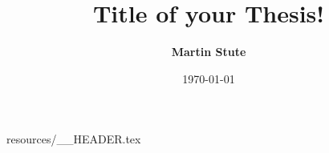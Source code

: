 
 {resources/__HEADER.tex}
\entrue


	

		\title 				{Title of your Thesis!}
		\author 			{\textbf{Martin Stute}}
		\def\authordata		{Pferdeweg 42 \\
				 		50769, Cologne \\
				 		martin.stute@gmx.de \\
				 		0221 | 12345678 }
		\def\studentid 		{123456} 
		\def\firstexaminer 	{Prof. Dr. First Examiner}		
		\def\secondexaminer 	{Prof. Dr. Second Examiner}		
					
		 \date 			{\today}			%
		 \def\typeofdoc 		{Master Thesis}
		 \def\department 	{\en 	{Department of Electrical Engineering, \\
						 	 Mechanical Engineering and\\ 
		 				 	 Technical Journalism (EMT)} 
						\de 	{Fachbereich Elektrotechnik, Maschinenbau \\
							 und Technikjournalismus (EMT)} \\}	
		 \def\relations		{\bfseries{Ford Werke GmbH | V}\normalfont{ehicle }\bfseries{E}\normalfont{valuation \& }\bfseries{V}\normalfont{erification}\normalfont}
		 \def\logofile		{logo_hbrs_svg}
		 \def\logofilesecond	{logo_ford_svg}
		 \def\restrictionnotice	{restriction_notice}
			
		
	

	\graphicspath{{figures/}} 
	\renewcommand{\arraystretch}{1.3}



	
	\pagestyle {normalpage}	
	\glsunsetall
	
	
	\pagestyle {normalpage}	
	\glsresetall

	
	
	
		
	
	
	


